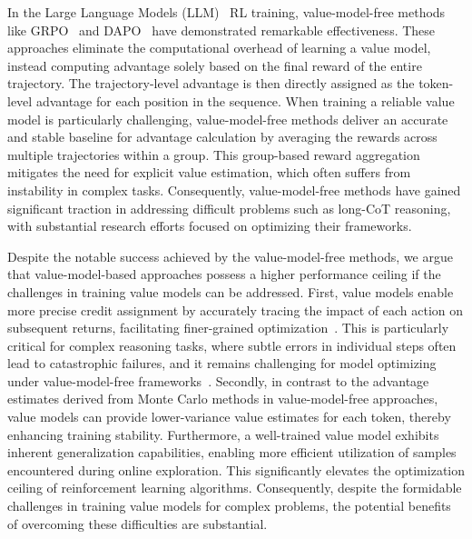 In the Large Language Models (LLM)~\cite{gpt3,gpt4,dsv3,grok,team2023gemini,claude35sonnet,chowdhery2023palm} RL training, value-model-free methods like GRPO~\cite{shao2024deepseekmath} and DAPO~\cite{dapo} have demonstrated remarkable effectiveness. These approaches eliminate the computational overhead of learning a value model, instead computing advantage solely based on the final reward of the entire trajectory. The trajectory-level advantage is then directly assigned as the token-level advantage for each position in the sequence. When training a reliable value model is particularly challenging, value-model-free methods deliver an accurate and stable baseline for advantage calculation by averaging the rewards across multiple trajectories within a group. This group-based reward aggregation mitigates the need for explicit value estimation, which often suffers from instability in complex tasks. Consequently, value-model-free methods have gained significant traction in addressing difficult problems such as long-CoT reasoning, with substantial research efforts focused on optimizing their frameworks.

Despite the notable success achieved by the value-model-free methods, we argue that value-model-based approaches possess a higher performance ceiling if the challenges in training value models can be addressed. First, value models enable more precise credit assignment by accurately tracing the impact of each action on subsequent returns, facilitating finer-grained optimization~\cite{ppo}. This is particularly critical for complex reasoning tasks, where subtle errors in individual steps often lead to catastrophic failures, and it remains challenging for model optimizing under value-model-free frameworks~\cite{vc-ppo}. Secondly, in contrast to the advantage estimates derived from Monte Carlo methods in value-model-free approaches, value models can provide lower-variance value estimates for each token, thereby enhancing training stability. Furthermore, a well-trained value model exhibits inherent generalization capabilities, enabling more efficient utilization of samples encountered during online exploration. This significantly elevates the optimization ceiling of reinforcement learning algorithms. Consequently, despite the formidable challenges in training value models for complex problems, the potential benefits of overcoming these difficulties are substantial.

